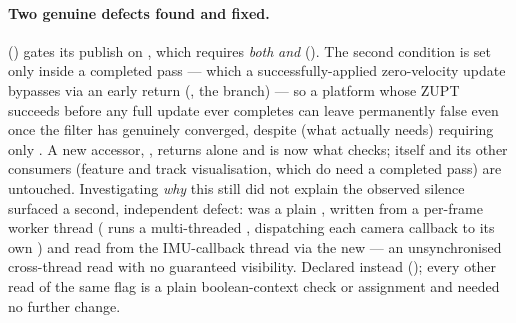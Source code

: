 \paragraph{Two genuine defects found and fixed.}  () gates
its publish on , which requires
\emph{both}  \emph{and}
 ().
The second condition is set only inside a completed
 pass — which a successfully-applied
zero-velocity update bypasses via an early return
(, the  branch) — so a
platform whose ZUPT succeeds before any full update ever completes can
leave  permanently false even once the filter has
genuinely converged, despite  (what
 actually needs) requiring only
. A new accessor, , returns  alone and is now what
 checks;  itself and its
other consumers (feature and track visualisation, which do need a
completed pass) are untouched. Investigating \emph{why} this still did not
explain the observed silence surfaced a second, independent defect:
 was a plain , written from a
per-frame worker thread ( runs a multi-threaded
, dispatching each camera callback to its own
) and read from the IMU-callback thread via the new
 — an unsynchronised cross-thread read with no
guaranteed visibility. Declared  instead
(); every other read of the same flag is a plain
boolean-context check or assignment and needed no further change.

